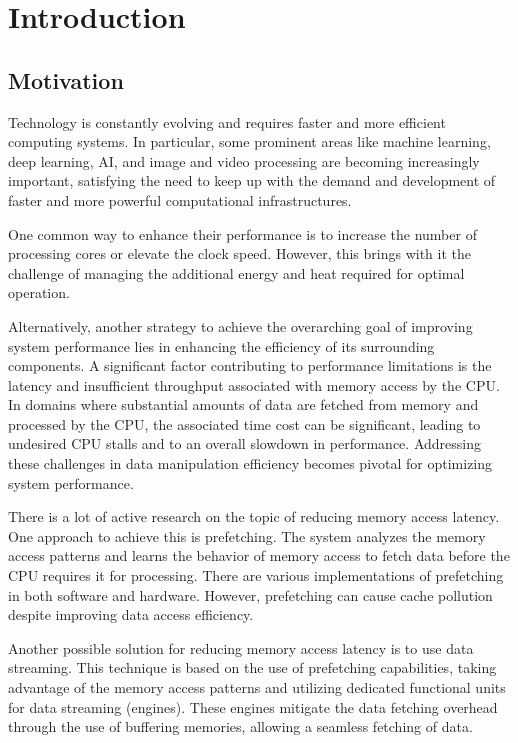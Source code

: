 
\chapter{Introduction}
\label{chapter:introduction}
\section{Motivation}

Technology is constantly evolving and requires faster and more efficient computing systems. In particular, some prominent areas like machine learning, deep learning, AI, and image and video processing are becoming increasingly important, satisfying the need to keep up with the demand and development of faster and more powerful computational infrastructures.

One common way to enhance their performance is to increase the number of processing cores or elevate the clock speed. However, this brings with it the challenge of managing the additional energy and heat required for optimal operation.

Alternatively, another strategy to achieve the overarching goal of improving system performance lies in enhancing the efficiency of its surrounding components. A significant factor contributing to performance limitations is the latency and insufficient throughput associated with memory access by the CPU. In domains where substantial amounts of data are fetched from memory and processed by the CPU, the associated time cost can be significant, leading to undesired CPU stalls and to an overall slowdown in performance. Addressing these challenges in data manipulation efficiency becomes pivotal for optimizing system performance.

There is a lot of active research on the topic of reducing memory access latency. One approach to achieve this is prefetching. The system analyzes the memory access patterns and learns the behavior of memory access to fetch data before the CPU requires it for processing. There are various implementations of prefetching in both software and hardware. However, prefetching can cause cache pollution despite improving data access efficiency.

Another possible solution for reducing memory access latency is to use data streaming. This technique is based on the use of prefetching capabilities, taking advantage of the memory access patterns and utilizing dedicated functional units for data streaming (engines). These engines mitigate the data fetching overhead through the use of buffering memories, allowing a seamless fetching of data. 


